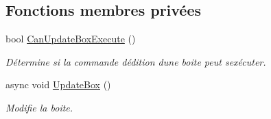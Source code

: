 \subsection*{Fonctions membres privées}
\begin{DoxyCompactItemize}
\item 
bool \hyperlink{class_boxes_1_1_view_models_1_1_edit_box_view_model_af70fdcc783221589824ef5000f000b39}{Can\+Update\+Box\+Execute} ()
\begin{DoxyCompactList}\small\item\em Détermine si la commande d\textquotesingle{}édition d\textquotesingle{}une boite peut s\textquotesingle{}exécuter. \end{DoxyCompactList}\item 
async void \hyperlink{class_boxes_1_1_view_models_1_1_edit_box_view_model_a52745545a871a523a4e66d70f172e325}{Update\+Box} ()
\begin{DoxyCompactList}\small\item\em Modifie la boite. \end{DoxyCompactList}\end{DoxyCompactItemize}
